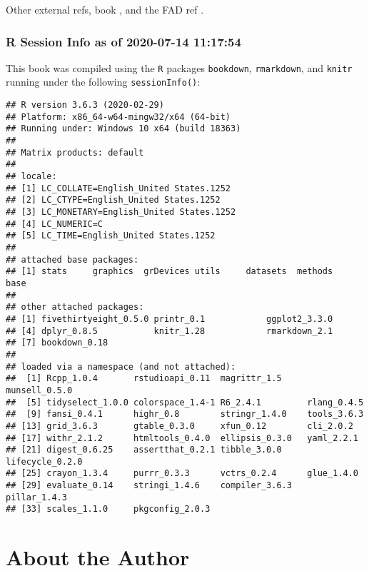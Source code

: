 \documentclass[
]{book}
\begin{document}
Other external refs, book \citep{xie2015}, and the FAD ref \citep{Miller_Epstein_Bishop_Keitner_1985}.

\hypertarget{r-session-info-as-of-2020-07-14-111754}{%
\subsection*{R Session Info as of 2020-07-14 11:17:54}\label{r-session-info-as-of-2020-07-14-111754}}

This book was compiled using the \texttt{R} packages \texttt{bookdown}, \texttt{rmarkdown}, and \texttt{knitr} running under the following \texttt{sessionInfo()}:

\begin{verbatim}
## R version 3.6.3 (2020-02-29)
## Platform: x86_64-w64-mingw32/x64 (64-bit)
## Running under: Windows 10 x64 (build 18363)
## 
## Matrix products: default
## 
## locale:
## [1] LC_COLLATE=English_United States.1252 
## [2] LC_CTYPE=English_United States.1252   
## [3] LC_MONETARY=English_United States.1252
## [4] LC_NUMERIC=C                          
## [5] LC_TIME=English_United States.1252    
## 
## attached base packages:
## [1] stats     graphics  grDevices utils     datasets  methods   base     
## 
## other attached packages:
## [1] fivethirtyeight_0.5.0 printr_0.1            ggplot2_3.3.0        
## [4] dplyr_0.8.5           knitr_1.28            rmarkdown_2.1        
## [7] bookdown_0.18        
## 
## loaded via a namespace (and not attached):
##  [1] Rcpp_1.0.4       rstudioapi_0.11  magrittr_1.5     munsell_0.5.0   
##  [5] tidyselect_1.0.0 colorspace_1.4-1 R6_2.4.1         rlang_0.4.5     
##  [9] fansi_0.4.1      highr_0.8        stringr_1.4.0    tools_3.6.3     
## [13] grid_3.6.3       gtable_0.3.0     xfun_0.12        cli_2.0.2       
## [17] withr_2.1.2      htmltools_0.4.0  ellipsis_0.3.0   yaml_2.2.1      
## [21] digest_0.6.25    assertthat_0.2.1 tibble_3.0.0     lifecycle_0.2.0 
## [25] crayon_1.3.4     purrr_0.3.3      vctrs_0.2.4      glue_1.4.0      
## [29] evaluate_0.14    stringi_1.4.6    compiler_3.6.3   pillar_1.4.3    
## [33] scales_1.1.0     pkgconfig_2.0.3
\end{verbatim}

\hypertarget{about-the-author}{%
\chapter*{About the Author}\label{about-the-author}}
\end{document}

